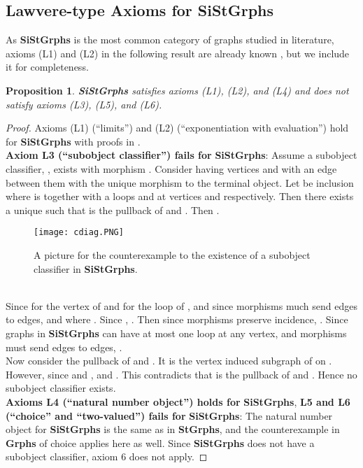 \documentclass[11pt]{article}
\newtheorem{proposition}[theorem]{Proposition}
\begin{document}
\subsection{Lawvere-type Axioms for \textbf{SiStGrphs}}
\indent As \textbf{SiStGrphs} is the most common category of graphs studied in literature, axioms (L1) and (L2) in the following result are already known \cites{HN2004, Dochtermann}, but we include it for completeness.
\begin{proposition}
\textbf{SiStGrphs} satisfies axioms (L1), (L2), and (L4) and does not satisfy axioms (L3), (L5), and (L6).
\end{proposition}
\begin{proof}
Axioms (L1) (``limits'') and (L2) (``exponentiation with evaluation'') hold for \textbf{SiStGrphs} with proofs in \cites{HN2004, Dochtermann}.\\
\indent \textbf{Axiom L3 (``subobject classifier'') fails for} \textbf{SiStGrphs}: Assume a subobject classifier, , exists with morphism . Consider  having vertices  and  with an edge  between them with  the unique morphism to the terminal object. Let  be inclusion where  is  together with a loops  and  at vertices  and  respectively. Then there exists a unique  such that  is the pullback of  and . Then .
\begin{figure}[h]
\centering \texttt{[image: cdiag.PNG]}
\caption{A picture for the counterexample to the existence of a subobject classifier in \textbf{SiStGrphs}.}
\end{figure}\\
\indent Since  for  the vertex of  and  for  the loop of , and since morphisms much send edges to edges,  and  where \textunderscore. Since , . Then since morphisms preserve incidence, \textunderscore. Since graphs in \textbf{SiStGrphs} can have at most one loop at any vertex, and morphisms must send edges to edges, .\\
\indent Now consider the pullback of  and . It is the vertex induced subgraph of  on . However, since  and ,  and . This contradicts that  is the pullback of  and . Hence no subobject classifier exists.\\
\indent \textbf{Axioms L4 (``natural number object'') holds for } \textbf{SiStGrphs}, \textbf{L5 and L6 (``choice'' and ``two-valued'') fails for} \textbf{SiStGrphs}: The natural number object for \textbf{SiStGrphs} is the same as in \textbf{StGrphs}, and the counterexample in \textbf{Grphs} of choice applies here as well. Since \textbf{SiStGrphs} does not have a subobject classifier, axiom 6 does not apply.
\end{proof}
\end{document}

